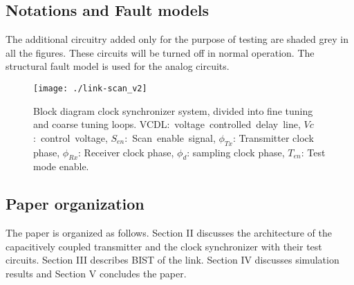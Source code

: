 \documentclass[conference]{IEEEtran}
\begin{document}
\subsection{Notations and Fault models}
The additional circuitry added only for the purpose of testing are shaded
grey in all the figures. These circuits will be turned off in normal operation.
The structural fault model \cite{bist-pll-tcas2-01} is used 
for the analog circuits.
\begin{figure*}[t!]
\centering
{}
\texttt{[image: ./link-scan\_v2]}
\caption{Block diagram clock synchronizer system, divided
into fine tuning and coarse tuning loops.
\mbox{VCDL: voltage controlled delay line},
\mbox{$Vc$: control voltage}, \mbox{$S_{en}$: Scan enable signal},
$\phi_{Tx}$: Transmitter clock phase,
$\phi_{Rx}$: Receiver clock phase,
$\phi_d$: sampling clock phase,
$T_{en}$: Test mode enable.}
\label{fig:link-scan}
\end{figure*}


\subsection{Paper organization}
The paper is organized as follows. Section II discusses the 
architecture of the capacitively coupled transmitter and the clock 
synchronizer with their test circuits. Section III
describes BIST of the link. Section IV discusses simulation
results and Section V concludes the paper.
\end{document}
